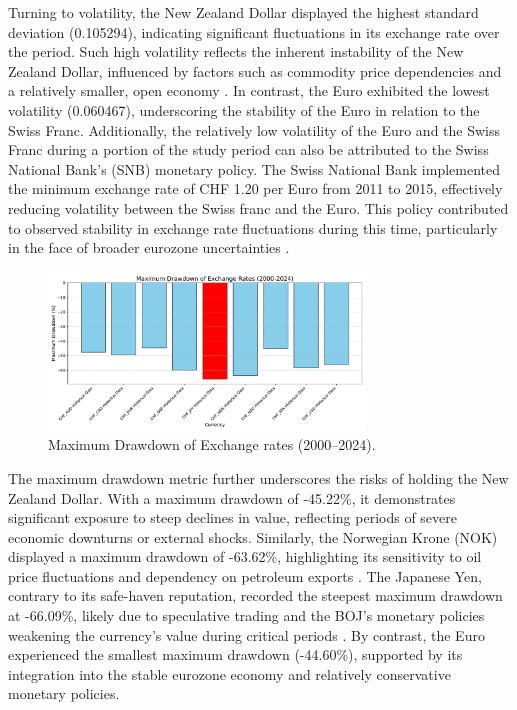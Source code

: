 \documentclass[11pt,a4paper,english,oneside]{book}
\begin{document}
Turning to volatility, the New Zealand Dollar displayed the highest standard deviation (0.105294), indicating significant fluctuations in its exchange rate over the period. Such high volatility reflects the inherent instability of the New Zealand Dollar, influenced by factors such as commodity price dependencies and a relatively smaller, open economy \parencite{chen2003commodity}. In contrast, the Euro exhibited the lowest volatility (0.060467), underscoring the stability of the Euro in relation to the Swiss Franc. Additionally, the relatively low volatility of the Euro and the Swiss Franc during a portion of the study period can also be attributed to the Swiss National Bank’s (SNB) monetary policy. The Swiss National Bank implemented the minimum exchange rate of CHF 1.20 per Euro from 2011 to 2015, effectively reducing volatility between the Swiss franc and the Euro. This policy contributed to observed stability in exchange rate fluctuations during this time, particularly in the face of broader eurozone uncertainties \parencite{auer2015safe}.

\begin{figure}[h!]
    \centering
    \includegraphics[width=0.75\textwidth]{images/maximum_drawdown_2000_2024.pdf}
    \caption{Maximum Drawdown of Exchange rates (2000--2024).}
    \label{fig:maximum_drawdown_2000_2024}
\end{figure}

The maximum drawdown metric further underscores the risks of holding the New Zealand Dollar. With a maximum drawdown of -45.22\%, it demonstrates significant exposure to steep declines in value, reflecting periods of severe economic downturns or external shocks. Similarly, the Norwegian Krone (NOK) displayed a maximum drawdown of -63.62\%, highlighting its sensitivity to oil price fluctuations and dependency on petroleum exports \parencite{bergholt2016business}. The Japanese Yen, contrary to its safe-haven reputation, recorded the steepest maximum drawdown at -66.09\%, likely due to speculative trading and the BOJ's monetary policies weakening the currency's value during critical periods \parencite{shirai2020bank}. By contrast, the Euro experienced the smallest maximum drawdown (-44.60\%), supported by its integration into the stable eurozone economy and relatively conservative monetary policies.
\end{document}
